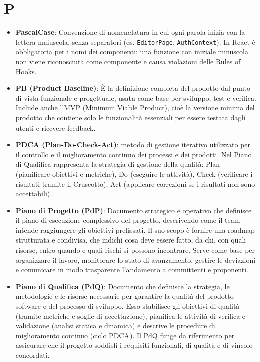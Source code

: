 \documentclass[11pt,a4paper]{article}
\begin{document}
\section*{P}
\begin{itemize}
\item \textbf{PascalCase}: Convenzione di nomenclatura in cui ogni parola inizia con la lettera maiuscola, senza separatori (es. \texttt{EditorPage}, \texttt{AuthContext}). In React è obbligatoria per i nomi dei componenti: una funzione con iniziale minuscola non viene riconosciuta come componente e causa violazioni delle Rules of Hooks.

\item \textbf{PB (Product Baseline)}: È la definizione completa del prodotto dal punto di vista funzionale e progettuale, usata come base per sviluppo, test e verifica. Include anche l’MVP (Minimum Viable Product), cioè la versione minima del prodotto che contiene solo le funzionalità essenziali per essere testata dagli utenti e ricevere feedback.

\item \textbf{PDCA (Plan-Do-Check-Act)}: metodo di gestione iterativo utilizzato per il controllo e il miglioramento continuo dei processi e dei prodotti. Nel Piano di Qualifica rappresenta la strategia di gestione della qualità: Plan (pianificare obiettivi e metriche), Do (eseguire le attività), Check (verificare i risultati tramite il Cruscotto), Act (applicare correzioni se i risultati non sono accettabili).

\item \textbf{Piano di Progetto (PdP)}: Documento strategico e operativo che definisce il piano di esecuzione complessivo del progetto, descrivendo come il team intende raggiungere gli obiettivi prefissati. Il suo scopo è fornire una roadmap strutturata e condivisa, che indichi cosa deve essere fatto, da chi, con quali risorse, entro quando e quali rischi si possono incontrare. Serve come base per organizzare il lavoro, monitorare lo stato di avanzamento, gestire le deviazioni e comunicare in modo trasparente l’andamento a committenti e proponenti.

\item \textbf{Piano di Qualifica (PdQ)}: Documento che definisce la strategia, le metodologie e le risorse necessarie per garantire la qualità del prodotto software e del processo di sviluppo. Esso stabilisce gli obiettivi di qualità (tramite metriche e soglie di accettazione), pianifica le attività di verifica e validazione (analisi statica e dinamica) e descrive le procedure di miglioramento continuo (ciclo PDCA). Il PdQ funge da riferimento per assicurare che il progetto soddisfi i requisiti funzionali, di qualità e di vincolo concordati.


\end{itemize}
\end{document}
